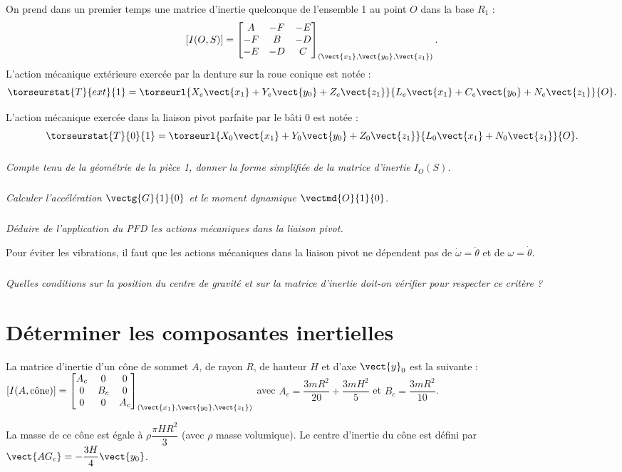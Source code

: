 \begin{multicols}{2}
On prend dans un premier temps une matrice d'inertie quelconque de l'ensemble 1 au point $O$ dans la base $R_1$ : $$\left[I(O,S)\right]=
\begin{bmatrix}
A & -F & -E \\ 
-F & B & -D \\ 
-E & -D & C
\end{bmatrix}_{(\vect{x_1},\vect{y_0},\vect{z_1})}.$$
L'action mécanique extérieure exercée par la denture sur la roue conique est notée : $$\torseurstat{T}{ext}{1}=\torseurl{X_e \vect{x_1}+Y_e \vect{y_0}+ Z_e \vect{z_1}}{L_e \vect{x_1}+C_e \vect{y_0}+N_e \vect{z_1}}{O}.$$

L'action mécanique exercée dans la liaison pivot parfaite par le bâti 0 est notée : $$\torseurstat{T}{0}{1}=\torseurl{X_0 \vect{x_1}+Y_0 \vect{y_0}+ Z_0 \vect{z_1}}{L_0 \vect{x_1}+ N_0\vect{z_1}}{O}.$$

\subparagraph{}
\textit{Compte tenu de la géométrie de la pièce 1, donner la forme simplifiée de la matrice d'inertie $I_O(S)$.}


\subparagraph{}
\textit{Calculer l'accélération $\vectg{G}{1}{0}$ et le moment dynamique $\vectmd{O}{1}{0}$.}


\subparagraph{}
\textit{Déduire de l'application du PFD les actions mécaniques dans la liaison pivot.}

Pour éviter les vibrations, il faut que les actions mécaniques dans la liaison pivot ne dépendent pas de $\dot{\omega}=\ddot{\theta}$ et de $\omega=\dot{\theta}$.

\subparagraph{}
\textit{Quelles conditions sur la position du centre de gravité et sur la matrice d'inertie doit-on vérifier pour respecter ce critère ?}


\section*{Déterminer les composantes inertielles}

La matrice d'inertie d'un cône de sommet $A$, de rayon $R$, de hauteur $H$ et d'axe $\vect{y}_0$ est la suivante : $\left[I(A,\text{cône})\right]=
\begin{bmatrix}
A_c & 0 & 0 \\ 
0 & B_c & 0 \\ 
0 & 0 & A_c
\end{bmatrix}_{(\vect{x_1},\vect{y_0},\vect{z_1})}
$
avec $A_c=\dfrac{3 m R^2}{20}+\dfrac{3mH^2}{5}$ et $B_c=\dfrac{3mR^2}{10}$.

La masse de ce cône est égale à $\rho \dfrac{\pi H R^2}{3}$ (avec $\rho$ masse volumique). Le centre d'inertie du cône est défini par $\vect{AG_c}=-\dfrac{3 H}{4} \vect{y_0}$.



\end{multicols}
